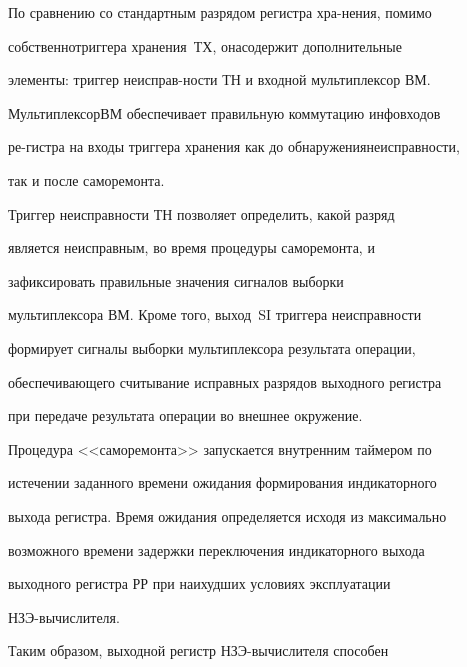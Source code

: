    По сравнению со стандартным разрядом регистра хра-\linebreak нения, помимо


собственно\linebreak триггера хранения~ТХ, она\linebreak содержит дополнительные


эле\-мен\-ты: триггер неисправ-\linebreak ности ТН и входной  мультиплексор ВМ.


Мультиплексор\linebreak ВМ обеспечивает правильную коммутацию инфовходов


ре-\linebreak гист\-ра на входы триггера хранения как до обнаружения\linebreak неисправности,


так и после саморемонта.





   Триггер неисправности ТН позволяет определить, какой разряд


является неисправным, во время процедуры саморемонта, и


зафиксировать правильные значения сигналов выборки


мультиплексора ВМ. Кроме того, выход~SI триггера неисправности


формирует сигналы выборки мультиплексора результата операции,


обеспечивающего считывание исправных разрядов выходного регистра


при передаче результата операции во внешнее окружение.





   Процедура <<саморемонта>> запускается внутренним таймером по


истечении заданного времени ожидания формирования индикаторного


выхода регистра. Время ожидания определяется исходя из максимально


возможного времени задержки пере\-клю\-че\-ния индикаторного выхода


выходного регистра РР при наихудших условиях эксплуатации


   НЗЭ-вы\-чис\-ли\-теля.





   Таким образом, выходной регистр НЗЭ-вы\-чис\-ли\-те\-ля способен



